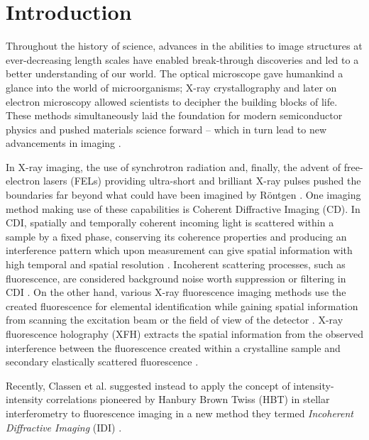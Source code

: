 \chapter{Introduction}
Throughout the history of science, advances in the abilities to image structures at ever-decreasing length scales have enabled break-through discoveries and led to a better understanding of our world.
The optical microscope gave humankind a glance into the world of microorganisms; X-ray crystallography and later on electron microscopy allowed scientists to decipher the building blocks of life\cite{hooke1665,laue1915,ruska1939,watson1953}. These methods simultaneously laid the foundation for modern semiconductor physics and pushed materials science forward
-- which in turn lead to new advancements in imaging \cite{teal1951,hovmoeller1984,jiang2018}.  

In X-ray imaging, the use of synchrotron radiation and, finally, the advent of free-electron lasers (FELs) providing ultra-short and brilliant X-ray pulses pushed the boundaries far beyond what could have been imagined by Röntgen \cite{cloetens1996,emma2010}. One imaging method making use of these capabilities is Coherent Diffractive Imaging (CD). In CDI, spatially and temporally coherent incoming light is scattered within a sample by a fixed phase, conserving its coherence properties and producing an interference pattern which upon measurement can give spatial information with high temporal and spatial resolution \cite{seibert2011,bostedt2010,barke2015}. Incoherent scattering processes, such as fluorescence, are considered background noise worth suppression or filtering in CDI \cite{schultz2013chapter7}.  On the other hand, various X-ray fluorescence imaging methods use  the created fluorescence for elemental identification while gaining spatial information from scanning the excitation beam or the field of view of the detector \cite{vincze2004,pushie2014}.  X-ray fluorescence holography (XFH) extracts the spatial information from the observed interference between the fluorescence created within a crystalline sample and secondary elastically scattered fluorescence \cite{tegze1996,gog1996}.

Recently, Classen et al. suggested instead to apply the concept of intensity-intensity correlations pioneered by Hanbury Brown Twiss (HBT) in stellar interferometry to fluorescence imaging in a new method they termed \textit{Incoherent Diffractive Imaging} (IDI) \cite{classen2017,hanbury1956}. 

